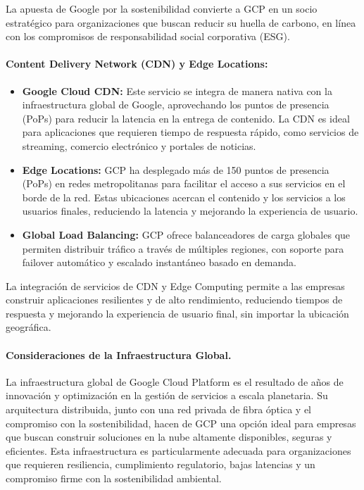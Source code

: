 {                La apuesta de Google por la sostenibilidad convierte a GCP en un socio estratégico para organizaciones que buscan reducir su huella de carbono, en línea con los compromisos de responsabilidad social corporativa (ESG).
                
                \paragraph{Content Delivery Network (CDN) y Edge Locations:}
                
                \begin{itemize}
                    \item \textbf{Google Cloud CDN:} Este servicio se integra de manera nativa con la infraestructura global de Google, aprovechando los puntos de presencia (PoPs) para reducir la latencia en la entrega de contenido. La CDN es ideal para aplicaciones que requieren tiempo de respuesta rápido, como servicios de streaming, comercio electrónico y portales de noticias.
                    \item \textbf{Edge Locations:} GCP ha desplegado más de 150 puntos de presencia (PoPs) en redes metropolitanas para facilitar el acceso a sus servicios en el borde de la red. Estas ubicaciones acercan el contenido y los servicios a los usuarios finales, reduciendo la latencia y mejorando la experiencia de usuario.
                    \item \textbf{Global Load Balancing:} GCP ofrece balanceadores de carga globales que permiten distribuir tráfico a través de múltiples regiones, con soporte para failover automático y escalado instantáneo basado en demanda.
                \end{itemize}
                
                La integración de servicios de CDN y Edge Computing permite a las empresas construir aplicaciones resilientes y de alto rendimiento, reduciendo tiempos de respuesta y mejorando la experiencia de usuario final, sin importar la ubicación geográfica.
                
                \paragraph{Consideraciones de la Infraestructura Global.}
                La infraestructura global de Google Cloud Platform es el resultado de años de innovación y optimización en la gestión de servicios a escala planetaria. Su arquitectura distribuida, junto con una red privada de fibra óptica y el compromiso con la sostenibilidad, hacen de GCP una opción ideal para empresas que buscan construir soluciones en la nube altamente disponibles, seguras y eficientes. Esta infraestructura es particularmente adecuada para organizaciones que requieren resiliencia, cumplimiento regulatorio, bajas latencias y un compromiso firme con la sostenibilidad ambiental.

}
